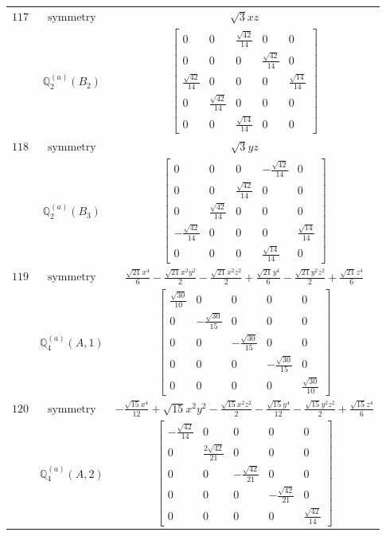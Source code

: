 \documentclass[fleqn,8pt,landscape]{jsarticle}
\begin{document}
\begin{longtable}{ccc}
$ 117 $ & $ \text{symmetry} $ & $ \sqrt{3} x z $ \\
$  $ & $ \mathbb{Q}_{2}^{(a)}(B_{2}) $ & $ \begin{bmatrix} 0 & 0 & \frac{\sqrt{42}}{14} & 0 & 0 \\ 0 & 0 & 0 & \frac{\sqrt{42}}{14} & 0 \\ \frac{\sqrt{42}}{14} & 0 & 0 & 0 & \frac{\sqrt{14}}{14} \\ 0 & \frac{\sqrt{42}}{14} & 0 & 0 & 0 \\ 0 & 0 & \frac{\sqrt{14}}{14} & 0 & 0 \end{bmatrix} $ \\ \hline
$ 118 $ & $ \text{symmetry} $ & $ \sqrt{3} y z $ \\
$  $ & $ \mathbb{Q}_{2}^{(a)}(B_{3}) $ & $ \begin{bmatrix} 0 & 0 & 0 & - \frac{\sqrt{42}}{14} & 0 \\ 0 & 0 & \frac{\sqrt{42}}{14} & 0 & 0 \\ 0 & \frac{\sqrt{42}}{14} & 0 & 0 & 0 \\ - \frac{\sqrt{42}}{14} & 0 & 0 & 0 & \frac{\sqrt{14}}{14} \\ 0 & 0 & 0 & \frac{\sqrt{14}}{14} & 0 \end{bmatrix} $ \\ \hline
$ 119 $ & $ \text{symmetry} $ & $ \frac{\sqrt{21} x^{4}}{6} - \frac{\sqrt{21} x^{2} y^{2}}{2} - \frac{\sqrt{21} x^{2} z^{2}}{2} + \frac{\sqrt{21} y^{4}}{6} - \frac{\sqrt{21} y^{2} z^{2}}{2} + \frac{\sqrt{21} z^{4}}{6} $ \\
$  $ & $ \mathbb{Q}_{4}^{(a)}(A,1) $ & $ \begin{bmatrix} \frac{\sqrt{30}}{10} & 0 & 0 & 0 & 0 \\ 0 & - \frac{\sqrt{30}}{15} & 0 & 0 & 0 \\ 0 & 0 & - \frac{\sqrt{30}}{15} & 0 & 0 \\ 0 & 0 & 0 & - \frac{\sqrt{30}}{15} & 0 \\ 0 & 0 & 0 & 0 & \frac{\sqrt{30}}{10} \end{bmatrix} $ \\ \hline
$ 120 $ & $ \text{symmetry} $ & $ - \frac{\sqrt{15} x^{4}}{12} + \sqrt{15} x^{2} y^{2} - \frac{\sqrt{15} x^{2} z^{2}}{2} - \frac{\sqrt{15} y^{4}}{12} - \frac{\sqrt{15} y^{2} z^{2}}{2} + \frac{\sqrt{15} z^{4}}{6} $ \\
$  $ & $ \mathbb{Q}_{4}^{(a)}(A,2) $ & $ \begin{bmatrix} - \frac{\sqrt{42}}{14} & 0 & 0 & 0 & 0 \\ 0 & \frac{2 \sqrt{42}}{21} & 0 & 0 & 0 \\ 0 & 0 & - \frac{\sqrt{42}}{21} & 0 & 0 \\ 0 & 0 & 0 & - \frac{\sqrt{42}}{21} & 0 \\ 0 & 0 & 0 & 0 & \frac{\sqrt{42}}{14} \end{bmatrix} $ \\ \hline

\end{longtable}
\end{document}
